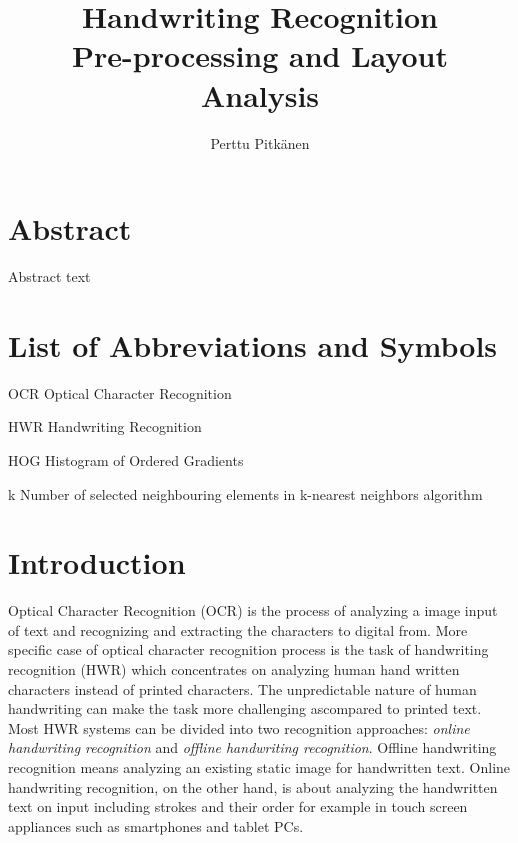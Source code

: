 \documentclass{article}
\title{%
    Handwriting Recognition \\
    \large Pre-processing and Layout Analysis}
\author{Perttu Pitk{\"a}nen}
\begin{document}
   \maketitle

   \newpage
   \section*{Abstract}
    Abstract text

   \newpage
   \tableofcontents


   \newpage
   \section*{List of Abbreviations and Symbols}

   \begin{abbrv}
    \item[OCR] Optical Character Recognition
    \item[HWR] Handwriting Recognition
    \item[HOG] Histogram of Ordered Gradients
    \item[k] Number of selected neighbouring elements in k-nearest neighbors algorithm
   \end{abbrv}

   \newpage
   \section{Introduction}
    Optical Character Recognition (OCR) is the process of analyzing a image input of  text and recognizing and extracting the characters to digital from. More specific case of optical character recognition process is the task of handwriting recognition (HWR) which concentrates on analyzing human hand written characters instead of printed characters. The unpredictable nature of human handwriting can make the task more challenging ascompared to printed text. Most HWR systems can be divided into two recognition approaches: \textit{online handwriting recognition} and \textit{offline handwriting recognition}. Offline handwriting recognition means analyzing an existing static image for handwritten text. Online handwriting recognition, on the other hand, is about analyzing the handwritten text on input including strokes and their order for example in touch screen appliances such as smartphones and tablet PCs.
\end{document}
